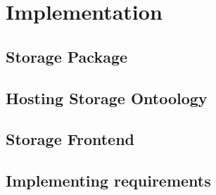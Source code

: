\chapter{Implementation}
\label{chap:num_5}


\section{Storage Package}

\section{Hosting Storage Ontoology}

\section{Storage Frontend}

\section{Implementing requirements}
